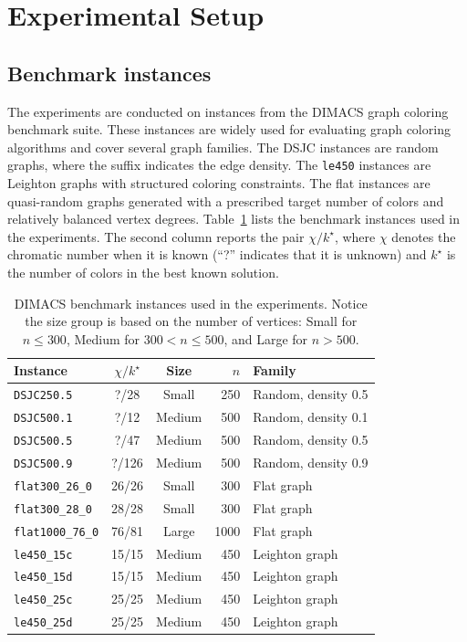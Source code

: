 \section{Experimental Setup}
\label{sec:setup}

\subsection{Benchmark instances}
\label{ssec:instances}

The experiments are conducted on instances from the DIMACS graph
coloring benchmark suite. These instances are widely used for
evaluating graph coloring algorithms and cover several graph families.
The DSJC instances are random graphs, where the suffix indicates the
edge density. The \texttt{le450} instances are Leighton graphs with
structured coloring constraints. The flat instances are quasi-random
graphs generated with a prescribed target number of colors and
relatively balanced vertex degrees. Table~\ref{tab:instances} lists
the benchmark instances used in the experiments. The second column
reports the pair $\chi/k^\star$, where $\chi$ denotes the chromatic
number when it is known (``?'' indicates that it is unknown) and
$k^\star$ is the number of colors in the best known solution.

\begin{table}[t]
\centering
\caption{DIMACS benchmark instances used in the experiments. Notice the size group is based on the number of vertices: Small for
$n\leq 300$, Medium for $300<n\leq 500$, and Large for $n>500$.}
\label{tab:instances}
\small
\setlength{\tabcolsep}{5pt}
\begin{tabular}{@{}lccrl@{}}
\toprule
Instance & $\chi/k^\star$ & Size & $n$ & Family \\
\midrule
\texttt{DSJC250.5}        & ?/28   & Small  & 250  & Random, density 0.5 \\
\texttt{DSJC500.1}        & ?/12   & Medium & 500  & Random, density 0.1 \\
\texttt{DSJC500.5}        & ?/47   & Medium & 500  & Random, density 0.5 \\
\texttt{DSJC500.9}        & ?/126  & Medium & 500  & Random, density 0.9 \\
\texttt{flat300\_26\_0}   & 26/26  & Small  & 300  & Flat graph \\
\texttt{flat300\_28\_0}   & 28/28  & Small  & 300  & Flat graph \\
\texttt{flat1000\_76\_0}  & 76/81  & Large  & 1000 & Flat graph \\
\texttt{le450\_15c}       & 15/15  & Medium & 450  & Leighton graph \\
\texttt{le450\_15d}       & 15/15  & Medium & 450  & Leighton graph \\
\texttt{le450\_25c}       & 25/25  & Medium & 450  & Leighton graph \\
\texttt{le450\_25d}       & 25/25  & Medium & 450  & Leighton graph \\
\bottomrule
\end{tabular}
\end{table}

